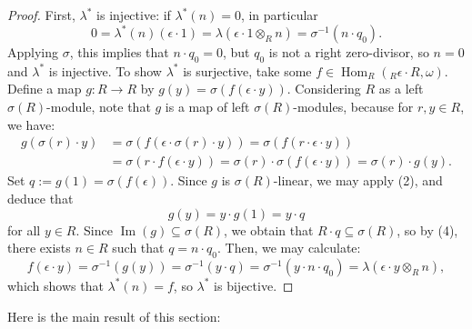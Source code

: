 \documentclass{amsart}
\theoremstyle{definition}
\newcommand{\opn}{\operatorname}
\numberwithin{equation}{section}
\begin{document}
\begin{proof}
First, $\lambda^*$ is injective:
if $\lambda^*(n) = 0$, in particular 
\[
0 = \lambda^*(n)(\epsilon \cdot 1) = \lambda(\epsilon\cdot 1\otimes_R n) = \sigma^{-1}(n\cdot q_0).
\]
Applying $\sigma$, this implies that $n\cdot q_0 = 0$,
but $q_0$ is not a right zero-divisor, so $n=0$ and $\lambda^*$ is injective.
To show $\lambda^*$ is surjective, take some $f \in \opn{Hom}_R({}_R \epsilon \cdot R,\omega)$.
Define a map $g:R \to R$ by $g(y) = \sigma(f(\epsilon \cdot y))$.
Considering $R$ as a left $\sigma(R)$-module, note that $g$ is a map of left $\sigma(R)$-modules, because for $r,y \in R$, we have:
\begin{align*}
g(\sigma(r)\cdot y) &= \sigma(f(\epsilon\cdot \sigma(r)\cdot y)) = 
\sigma(f(r\cdot \epsilon \cdot y)) \\
& = \sigma(r\cdot f(\epsilon \cdot y)) = \sigma(r) \cdot \sigma(f(\epsilon \cdot y) ) = \sigma(r) \cdot g(y).
\end{align*}
Set $q := g(1) = \sigma(f(\epsilon))$.
Since $g$ is $\sigma(R)$-linear, 
we may apply (2), and deduce that 
\[
g(y) = y\cdot g(1) = y\cdot q
\]
for all $y \in R$.
Since $\opn{Im}(g) \subseteq \sigma(R)$, we obtain that $R\cdot q \subseteq \sigma(R)$, so by (4),
there exists $n\in R$ such that $q = n\cdot q_0$.
Then, we may calculate:
\[
f(\epsilon \cdot y) = \sigma^{-1}(g(y)) = \sigma^{-1}(y\cdot q) =
\sigma^{-1}(y\cdot n \cdot q_0) = \lambda(\epsilon\cdot y\otimes_R n),
\]
which shows that $\lambda^*(n) = f$, so $\lambda^*$ is bijective.
\end{proof}

Here is the main result of this section:
\end{document}

